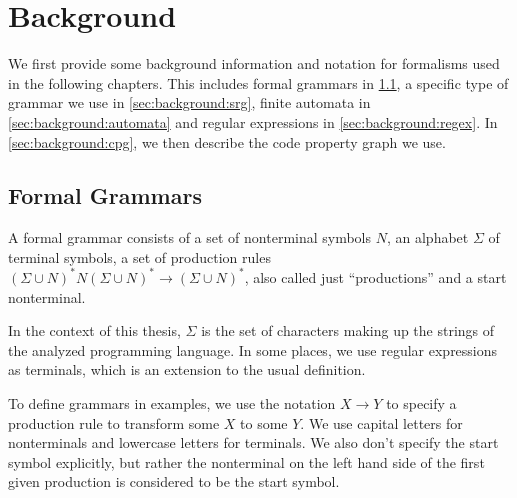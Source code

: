 \chapter{Background}
\label{chapter:Background}
\begin{comment}
What is the knowledge a undergrad student needs so that he/she can understand
your thesis? You can assume some familiarity with the very broad topic. E.g. if
you write a thesis in the area of software analysis, you do not have to explain
static/dynamic analysis as such (this is boring!). If you're a crypto guy, don't
explain AES in detail unless you try to break it in your thesis. If I stumble
across a word/term in your thesis and don't understand it, this is where I would
look it up (or on google).

Probably approx. 3-10 pages
\end{comment}

We first provide some background information and notation for formalisms used in the following chapters. This includes formal grammars in \ref{sec:background:grammars}, a specific type of grammar we use in \ref{sec:background:srg}, finite automata in \ref{sec:background:automata} and regular expressions in \ref{sec:background:regex}. In \ref{sec:background:cpg}, we then describe the code property graph we use.

\section{Formal Grammars}\label{sec:background:grammars}

A formal grammar consists of a set of nonterminal symbols $N$, an alphabet $\Sigma$ of terminal symbols, a set of production rules $(\Sigma \cup N)^*N(\Sigma \cup N)^* \rightarrow (\Sigma \cup N)^*$, also called just \enquote{productions} and a start nonterminal.

In the context of this thesis, $\Sigma$ is the set of characters making up the strings of the analyzed programming language. In some places, we use regular expressions as terminals, which is an extension to the usual definition.

To define grammars in examples, we use the notation $X \rightarrow Y$ to specify a production rule to transform some $X$ to some $Y$.
We use capital letters for nonterminals and lowercase letters for terminals. We also don't specify the start symbol explicitly, but rather the nonterminal on the left hand side of the first given production is considered to be the start symbol.

